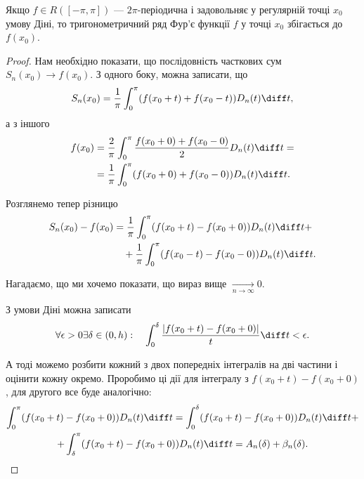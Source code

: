 \begin{theorem}
    Якщо $f \in R([-\pi, \pi])$ --- $2\pi$-періодична і задовольняє у регулярній точці $x_0$ умову Діні, то тригонометричний ряд Фур'є функції $f$ у точці $x_0$ збігається до $f(x_0)$.
\end{theorem}
\begin{proof}
    Нам необхідно показати, що послідовність часткових сум $S_n(x_0) \to f(x_0)$. З одного боку, можна записати, що
    \begin{equation}
        S_n(x_0) = \frac{1}{\pi} \int_0^\pi (f(x_0 + t) + f(x_0 - t)) D_n(t) \diff t,
    \end{equation}
    а з іншого
    \begin{equation}
        \begin{aligned}
            f(x_0)
            &= \frac{2}{\pi} \int_0^\pi \frac{f(x_0 + 0) + f(x_0 - 0)}{2} D_n(t) \diff t = \\
            &= \frac{1}{\pi} \int_0^\pi (f(x_0 + 0) + f(x_0 - 0)) D_n(t) \diff t.
        \end{aligned}
    \end{equation}
    
    Розглянемо тепер різницю
    \begin{equation}
        \begin{aligned}
            S_n(x_0) - f(x_0)
            &= \frac{1}{\pi} \int_0^\pi (f(x_0 + t) - f(x_0 + 0)) D_n(t) \diff t + \\
            &\quad + \frac{1}{\pi} \int_0^\pi (f(x_0 - t) - f(x_0 - 0)) D_n(t) \diff t.
        \end{aligned}
    \end{equation}
    
    Нагадаємо, що ми хочемо показати, що вираз вище $\xrightarrow[n \to \infty]{} 0$. \medskip
    
    З умови Діні можна записати
    \begin{equation}
        \forall \epsilon > 0 \exists \delta \in (0, h): \quad \int_0^\delta \frac{|f(x_0 + t) - f(x_0 + 0)|}{t} \diff t < \epsilon.
    \end{equation}
    
    А тоді можемо розбити кожний з двох попередніх інтегралів на дві частини і оцінити кожну окремо. Проробимо ці дії для інтегралу з $f(x_0 + t) - f(x_0 + 0)$, для другого все буде аналогічно:
    \begin{multline}
        \int_0^\pi (f(x_0 + t) - f(x_0 + 0)) D_n(t) \diff t = \int_0^\delta (f(x_0 + t) - f(x_0 + 0)) D_n(t) \diff t + \\
        + \int_\delta^\pi (f(x_0 + t) - f(x_0 + 0)) D_n(t) \diff t = A_n(\delta) + \beta_n(\delta).
    \end{multline}
    

\end{proof}
